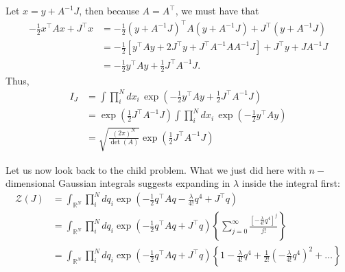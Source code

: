 \documentclass{book}
\theoremstyle{definition}
\newcommand{\f}[2]{\frac{#1}{#2}}
\newcommand{\lp}{\left(}
\newcommand{\rp}{\right)}
\newcommand{\lb}{\left[}
\newcommand{\rb}{\right]}
\newcommand{\lc}{\left\{}
\newcommand{\rc}{\right\}}
\newcommand{\Z}{\mathcal{Z}}
\begin{document}
Let $x = y + A^{-1}J$, then because $A = A^\top$, we must have that
\begin{align}
-\f{1}{2}x^\top A x + J^\top x &= -\f{1}{2}(y + A^{-1}J)^\top A (y + A^{-1}J) + J^\top (y + A^{-1}J)\nonumber\\
&= -\f{1}{2}\lb y^\top A y +2J^\top y + J^\top A^{-1}AA^{-1}J\rb + J^\top y + JA^{-1}J \nonumber\\
&= -\f{1}{2}y^\top A y + \f{1}{2}J^\top A^{-1}J.
\end{align}
Thus,
\begin{align}
I_J &= \int \prod_i^N dx_i\, \exp\lp -\f{1}{2}y^\top A y + \f{1}{2}J^\top A^{-1}J \rp\\
&= \exp\lp \f{1}{2}J^\top A^{-1}J \rp \int \prod_i^N dx_i\, \exp\lp -\f{1}{2}y^\top A y \rp \\
&= \boxed{ \sqrt{\f{(2\pi)^N}{\det(A)}} \exp\lp \f{1}{2}J^\top A^{-1}J \rp}
\end{align}

Let us now look back to the child problem. What we just did here with $n-$dimensional Gaussian integrals suggests expanding in $\lambda$ inside the integral first:
\begin{align}
\Z(J) &= \int_{\mathbb{R}^N} \prod_i^N dq_i  \exp\lp -\f{1}{2}q^\top A q - \f{\lambda}{4!}q^4 + J^\top q  \rp \nonumber \\ 
&= \int_{\mathbb{R}^N} \prod_i^N dq_i  \exp\lp -\f{1}{2}q^\top A q + J^\top q \rp
\lc \sum_{j=0}^\infty   \f{\lb -\f{\lambda}{4!}q^4\rb^j}{j!}  \rc \nonumber \\
&= \int_{\mathbb{R}^N} \prod_i^N dq_i  \exp\lp -\f{1}{2}q^\top A q + J^\top q \rp
\lc 1 -\f{\lambda}{4!}q^4 + \f{1}{2!}\lp-\f{\lambda}{4!}q^4\rp^2 + \dots   \rc  
\end{align}
\end{document}
